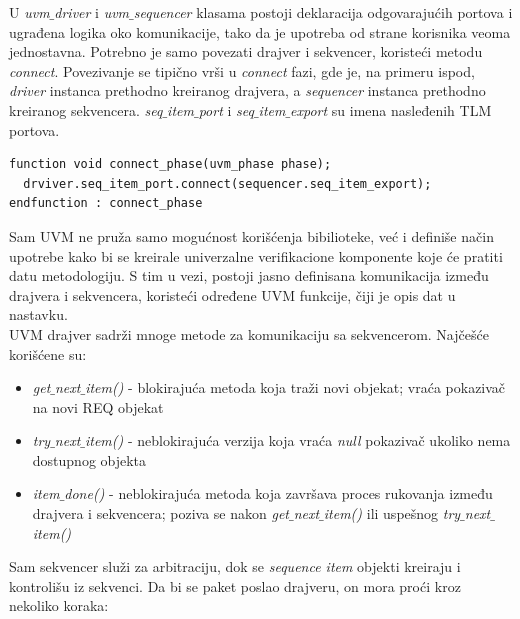 U \emph{uvm\(\_\)driver} i \emph{uvm\(\_\)sequencer} klasama postoji deklaracija
odgovarajućih portova i ugrađena logika oko komunikacije, tako da je upotreba
od strane korisnika veoma jednostavna. Potrebno je samo povezati drajver i
sekvencer, koristeći metodu \emph{connect}. Povezivanje se tipično vrši u
\emph{connect} fazi, gde je, na primeru ispod, \emph{driver} instanca prethodno
kreiranog drajvera, a \emph{sequencer} instanca prethodno kreiranog sekvencera.
\emph{seq\(\_\)item\(\_\)port} i \emph{seq\(\_\)item\(\_\)export} su imena
nasleđenih TLM portova.

\begin{lstlisting}
function void connect_phase(uvm_phase phase);
  drviver.seq_item_port.connect(sequencer.seq_item_export);
endfunction : connect_phase
\end{lstlisting}

Sam UVM ne pruža samo mogućnost korišćenja bibilioteke, već i definiše način
upotrebe kako bi se kreirale univerzalne verifikacione komponente koje će
pratiti datu metodologiju. S tim u vezi, postoji jasno definisana komunikacija
između drajvera i sekvencera, koristeći određene UVM funkcije, čiji je opis
dat u nastavku.\\

UVM drajver sadrži mnoge metode za komunikaciju sa sekvencerom. Najčešće
korišćene su:

\begin{itemize}
\item \emph{get\(\_\)next\(\_\)item()} - blokirajuća metoda koja traži novi
  objekat; vraća pokazivač na novi REQ objekat
\item \emph{try\(\_\)next\(\_\)item()} - neblokirajuća verzija koja vraća
  \emph{null} pokazivač ukoliko nema dostupnog objekta
\item \emph{item\(\_\)done()} - neblokirajuća metoda koja završava proces
  rukovanja između drajvera i sekvencera; poziva se nakon
  \emph{get\(\_\)next\(\_\)item()} ili uspešnog \emph{try\(\_\)next\(\_\)item()}
\end{itemize}

Sam sekvencer služi za arbitraciju, dok se \emph{sequence item} objekti kreiraju
i kontrolišu iz sekvenci.  Da bi se paket poslao drajveru, on mora proći kroz
nekoliko koraka:

